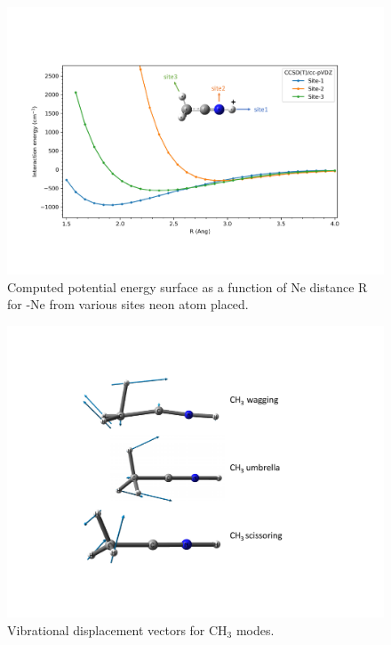 \begin{figure}
	\centering
		\includegraphics[width=1\textwidth]{chapters/CH3CNH+/figures/iso_comparison_with_Ne.pdf}
		\caption{Computed potential energy surface as a function of Ne distance R for \pan-Ne from various sites neon atom placed.}\label{fig:CH3CNH+:fig1}
\end{figure}

\begin{figure}

	\centering
		\includegraphics[scale=.5]{chapters/CH3CNH+/figures/vibration_vector.pdf}
		\caption{Vibrational displacement vectors for CH$_3$ modes.}\label{fig:CH3CNH+:fig2}
	\label{FIG:ch3_modes}
\end{figure}

